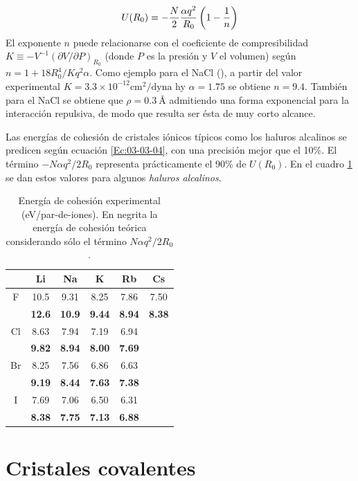 \begin{equation}
U(R_0) = - \frac{N}{2} \frac{\alpha q^2}{R_0} \left( 1-\frac{1}{n} \right) \label{Ec:03-03-04}
\end{equation}
El exponente $n$ puede relacionarse con el coeficiente de compresibilidad $K\equiv - V^{-1}(\partial V / \partial P)_{R_0}$ (donde $P$ es la presión y $V$ el volumen) según $n=1+18R_0^4 / Kq^2 \alpha$. Como ejemplo para el NaCl (\fcc), a partir del valor experimental $K=3.3\times 10^{-12} \unit{\cm}^2 / \text{dyna}$ hy $\alpha = 1.75$ se obtiene $n=9.4$. También para el NaCl se obtiene que $\rho=0.3 \ \unit{\angstrom}$ admitiendo una forma exponencial para la interacción repulsiva, de modo que resulta ser ésta de muy corto alcance.

Las energías de cohesión de cristales iónicos típicos como los haluros alcalinos se predicen según ecuación \ref{Ec:03-03-04}, con una precisión mejor que el 10\%. El término $-N\alpha q^2 / 2 R_0$ representa prácticamente el 90\% de $U(R_0)$. En el cuadro \ref{Tab:03-03} se dan estos valores para  algunos \textit{haluros alcalinos}.

\begin{table}[h!] \centering
    \begin{tabular}{c|ccccc}
        & Li & Na & K & Rb & Cs \\ \hline
        F & 10.5 & 9.31 & 8.25 & 7.86 & 7.50 \\
          & \textbf{12.6} & \textbf{10.9} & \textbf{9.44} & \textbf{8.94} & \textbf{8.38} \\ \hline
        Cl & 8.63  & 7.94 & 7.19 & 6.94 & \\
           & \textbf{9.82} & \textbf{8.94} & \textbf{8.00} & \textbf{7.69} & \\ \hline  
        Br & 8.25 & 7.56 & 6.86 & 6.63 & \\
           & \textbf{9.19} & \textbf{8.44} & \textbf{7.63} & \textbf{7.38} & \\ \hline
        I & 7.69 & 7.06 & 6.50 & 6.31 & \\
        & \textbf{8.38} & \textbf{7.75} & \textbf{7.13} & \textbf{6.88} &  
    \end{tabular}
    \caption{Energía de cohesión experimental (eV/par-de-iones). En negrita la energía de cohesión teórica considerando sólo el término $N\alpha q^2 / 2 R_0$.}
    \label{Tab:03-03}
\end{table}

\section{Cristales covalentes}


